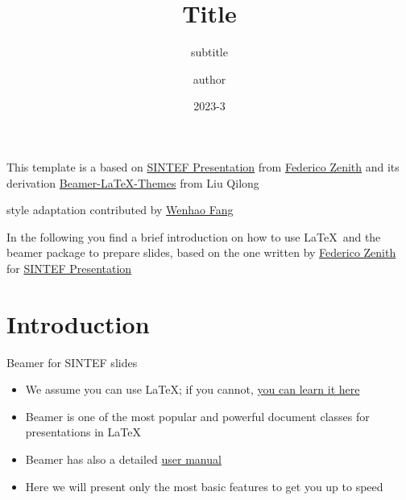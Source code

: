 \documentclass{beamer}
\title{Title}
\subtitle{subtitle}
\author{author}
\date{2023-3}
\newcommand{\hrefcol}[2]{\textcolor{cyan}{\href{#1}{#2}}}
\begin{document}
\maketitle

\begin{frame}

This template is a based on \hrefcol{https://www.overleaf.com/latex/templates/sintef-presentation/jhbhdffczpnx}{SINTEF Presentation} from \hrefcol{mailto:federico.zenith@sintef.no}{Federico Zenith} and its derivation \hrefcol{https://github.com/TOB-KNPOB/Beamer-LaTeX-Themes}{Beamer-LaTeX-Themes} from Liu Qilong

\vspace{\baselineskip}

 style adaptation contributed by \hrefcol{https://github.com/FangWHao}{Wenhao Fang}

\vspace{\baselineskip}

In the following you find a brief introduction on how to use \LaTeX\ and the beamer package to prepare slides, based on the one written by \hrefcol{mailto:federico.zenith@sintef.no}{Federico Zenith} for \hrefcol{https://www.overleaf.com/latex/templates/sintef-presentation/jhbhdffczpnx}{SINTEF Presentation}


\end{frame}

\section{Introduction}

\begin{frame}{Beamer for SINTEF slides}
\begin{itemize}
\item We assume you can use \LaTeX; if you cannot,
\hrefcol{http://en.wikibooks.org/wiki/LaTeX/}{you can learn it here}
\item Beamer is one of the most popular and powerful document
classes for presentations in \LaTeX
\item Beamer has also a detailed
\hrefcol{http://www.ctan.org/tex-archive/macros/latex/contrib/beamer/doc/beameruserguide.pdf}{user
 manual}
\item Here we will present only the most basic features to get you up to speed
\end{itemize}
\end{frame}
\end{document}
